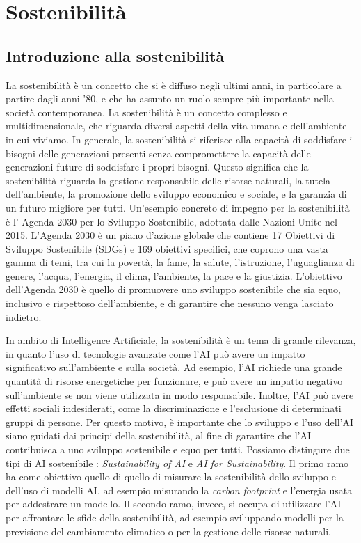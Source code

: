 \section{Sostenibilità}

\subsection{Introduzione alla sostenibilità}

La sostenibilità è un concetto che si è diffuso negli ultimi anni, in particolare a partire dagli anni '80, e che ha assunto un ruolo sempre più importante nella società contemporanea. La sostenibilità è un concetto complesso e multidimensionale, che riguarda diversi aspetti della vita umana e dell'ambiente in cui viviamo. In generale, la sostenibilità si riferisce alla capacità di soddisfare i bisogni delle generazioni presenti senza compromettere la capacità delle generazioni future di soddisfare i propri bisogni. Questo significa che la sostenibilità riguarda la gestione responsabile delle risorse naturali, la tutela dell'ambiente, la promozione dello sviluppo economico e sociale, e la garanzia di un futuro migliore per tutti.
Un'esempio concreto di impegno per la sostenibilità è l' Agenda 2030 per lo Sviluppo Sostenibile, adottata dalle Nazioni Unite nel 2015. L'Agenda 2030 è un piano d'azione globale che contiene 17 Obiettivi di Sviluppo Sostenibile (SDGs) e 169 obiettivi specifici, che coprono una vasta gamma di temi, tra cui la povertà, la fame, la salute, l'istruzione, l'uguaglianza di genere, l'acqua, l'energia, il clima, l'ambiente, la pace e la giustizia. L'obiettivo dell'Agenda 2030 è quello di promuovere uno sviluppo sostenibile che sia equo, inclusivo e rispettoso dell'ambiente, e di garantire che nessuno venga lasciato indietro.

\noindent In ambito di Intelligence Artificiale, la sostenibilità è un tema di grande rilevanza, in quanto l'uso di tecnologie avanzate come l'AI può avere un impatto significativo sull'ambiente e sulla società. Ad esempio, l'AI richiede una grande quantità di risorse energetiche per funzionare, e può avere un impatto negativo sull'ambiente se non viene utilizzata in modo responsabile. Inoltre, l'AI può avere effetti sociali indesiderati, come la discriminazione e l'esclusione di determinati gruppi di persone. Per questo motivo, è importante che lo sviluppo e l'uso dell'AI siano guidati dai principi della sostenibilità, al fine di garantire che l'AI contribuisca a uno sviluppo sostenibile e equo per tutti.
Possiamo distingure due tipi di AI sostenibile \cite{sostenibilita}: \textit{Sustainability of AI} e \textit{AI for Sustainability}. Il primo ramo ha come obiettivo quello di quello di misurare la sostenibilità dello sviluppo e dell'uso di modelli AI, ad esempio misurando la \textit{carbon footprint} e l'energia usata per addestrare un modello. Il secondo ramo, invece, si occupa di utilizzare l'AI per affrontare le sfide della sostenibilità, ad esempio sviluppando modelli per la previsione del cambiamento climatico o per la gestione delle risorse naturali.


